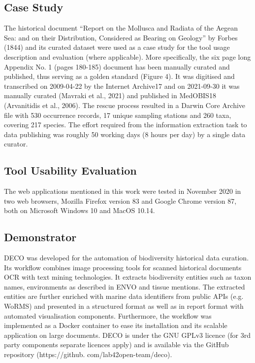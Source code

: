     \subsection{Case Study}
The historical document “Report on the Mollusca and Radiata of the Aegean Sea: and on their Distribution, Considered as Bearing on Geology” by Forbes (1844) and its curated dataset were used as a case study for the tool usage description and evaluation (where applicable). More specifically, the six page long Appendix No. 1 (pages 180-185) document has been manually curated and published, thus serving as a golden standard (Figure 4). It was digitised and transcribed on 2009-04-22 by the Internet Archive17 and on 2021-09-30 it was manually curated (Mavraki et al., 2021) and published in MedOBIS18 (Arvanitidis et al., 2006). The rescue process resulted in a Darwin Core Archive file with 530 occurrence records, 17 unique sampling stations and 260 taxa, covering 217 species. The effort required from the information extraction task to data publishing was roughly 50 working days (8 hours per day) by a single data curator.

    \subsection{Tool Usability Evaluation}
The web applications mentioned in this work were tested in November 2020 in 
two web browsers, Mozilla Firefox version 83 and Google Chrome version 87, both on Microsoft Windows 10 and MacOS 10.14.

    \subsection{Demonstrator}

    DECO was developed for the automation of biodiversity historical data curation. Its workflow combines image processing tools for scanned historical documents OCR with text mining technologies. It extracts biodiversity entities such as taxon names, environments as described in ENVO and tissue mentions. The extracted entities are further enriched with marine data identifiers from public APIs (e.g. WoRMS) and presented in a structured format as well as in report format with automated visualisation components. Furthermore, the workflow was implemented as a Docker container to ease its installation and its scalable application on large documents. DECO is under the GNU GPLv3 licence (for 3rd party components separate licences apply) and is available via the GitHub repository (https://github. com/lab42open-team/deco).


